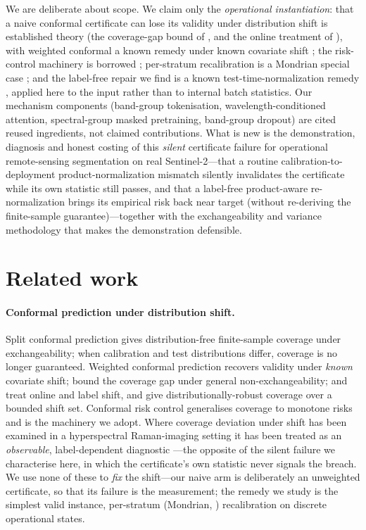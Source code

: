 \documentclass[preprint,3p,times]{elsarticle}
\begin{document}
We are deliberate about scope. We claim only the \emph{operational instantiation}: that a naive conformal certificate can lose its validity under distribution shift is established theory (the coverage-gap bound of \citet{barber2023}, and the online treatment of \citet{gibbs2021}), with weighted conformal a known remedy under known covariate shift \citep{tibshirani2019}; the risk-control machinery is borrowed \citep{angelopoulos2024}; per-stratum recalibration is a Mondrian special case \citep{vovk2005}; and the label-free repair we find is a known test-time-normalization remedy \citep{schneider2020,tent2021,dua2022,corley2024}, applied here to the input rather than to internal batch statistics. Our mechanism components (band-group tokenisation, wavelength-conditioned attention, spectral-group masked pretraining, band-group dropout) are cited reused ingredients, not claimed contributions. What is new is the demonstration, diagnosis and honest costing of this \emph{silent} certificate failure for operational remote-sensing segmentation on real Sentinel-2---that a routine calibration-to-deployment product-normalization mismatch silently invalidates the certificate while its own statistic still passes, and that a label-free product-aware re-normalization brings its empirical risk back near target (without re-deriving the finite-sample guarantee)---together with the exchangeability and variance methodology that makes the demonstration defensible.

\section{Related work}
\paragraph{Conformal prediction under distribution shift.} Split conformal prediction gives distribution-free finite-sample coverage under exchangeability; when calibration and test distributions differ, coverage is no longer guaranteed. Weighted conformal prediction \citep{tibshirani2019} recovers validity under \emph{known} covariate shift; \citet{barber2023} bound the coverage gap under general non-exchangeability; \citet{gibbs2021} and \citet{podkopaev2021} treat online and label shift, and \citet{cauchois2024} give distributionally-robust coverage over a bounded shift set. Conformal risk control \citep{angelopoulos2024} generalises coverage to monotone risks and is the machinery we adopt. Where coverage deviation under shift has been examined in a hyperspectral Raman-imaging setting it has been treated as an \emph{observable}, label-dependent diagnostic \citep{booksh2025}---the opposite of the silent failure we characterise here, in which the certificate's own statistic never signals the breach. We use none of these to \emph{fix} the shift---our naive arm is deliberately an unweighted certificate, so that its failure is the measurement; the remedy we study is the simplest valid instance, per-stratum (Mondrian, \citealt{vovk2005}) recalibration on discrete operational states.
\end{document}
